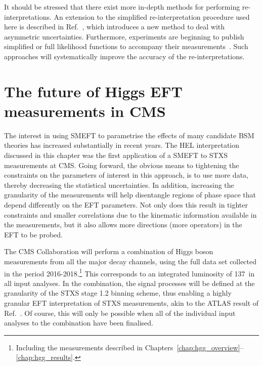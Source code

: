 It should be stressed that there exist more in-depth methods for performing re-interpretations. An extension to the simplified re-interpretation procedure used here is described in Ref.~\cite{Kraml:2019sis}, which introduces a new method to deal with asymmetric uncertainties. Furthermore, experiments are beginning to publish simplified or full likelihood functions to accompany their measurements~\cite{10.21468SciPostPhys.9.2.022}. Such approaches will systematically improve the accuracy of the re-interpretations.

\section{The future of Higgs EFT measurements in CMS}\label{sec:eft_improving}
The interest in using SMEFT to parametrise the effects of many candidate BSM theories has increased substantially in recent years. The HEL interpretation discussed in this chapter was the first application of a SMEFT to STXS measurements at CMS. Going forward, the obvious means to tightening the constraints on the parameters of interest in this approach, is to use more data, thereby decreasing the statistical uncertainties. In addition, increasing the granularity of the measurements will help disentangle regions of phase space that depend differently on the EFT parameters. Not only does this result in tighter constraints and smaller correlations due to the kinematic information available in the measurements, but it also allows more directions (more operators) in the EFT to be probed.  

The CMS Collaboration will perform a combination of Higgs boson measurements from all the major decay channels, using the full data set collected in the period 2016-2018.\footnote{Including the \Hgg measurements described in Chapters~\ref{chap:hgg_overview}--\ref{chap:hgg_results}.} This corresponds to an integrated luminosity of 137~\fbinv in all input analyses. In the combination, the signal processes will be defined at the granularity of the STXS stage 1.2 binning scheme, thus enabling a highly granular EFT interpretation of STXS measurements, akin to the ATLAS result of Ref.~\cite{ATLAS-CONF-2020-053}. Of course, this will only be possible when all of the individual input analyses to the combination have been finalised.

